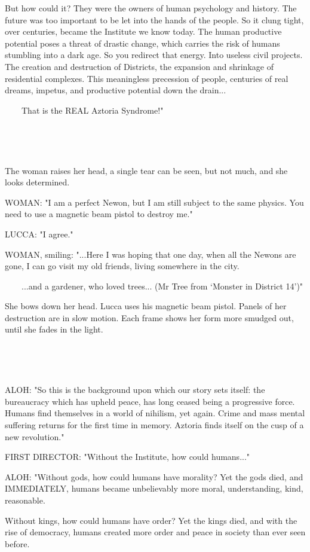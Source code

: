 \documentclass[11pt]{article}
\begin{document}
But how could it? 
They were the owners of human psychology and history.
The future was too important to be let into the hands of the people.
So it clung tight, over centuries, became the Institute we know today.
The human productive potential poses a threat of drastic change, which carries the risk of humans stumbling into a dark age.
So you redirect that energy.
Into useless civil projects.
The creation and destruction of Districts, the expansion and shrinkage of residential complexes.
This meaningless precession of people, centuries of real dreams, impetus, and productive potential down the drain...

\ \ \ \ That is the REAL Aztoria Syndrome!"

\ 

\ 

The woman raises her head, a single tear can be seen, but not much, and she looks determined.

WOMAN: "I am a perfect Newon, but I am still subject to the same physics.
You need to use a magnetic beam pistol to destroy me."

LUCCA: "I agree."

WOMAN, smiling: "...Here I was hoping that one day, when all the Newons are gone, I can go visit my old friends, living somewhere in the city.

\ \ \ \ ...and a gardener, who loved trees... (Mr Tree from `Monster in District 14')"

She bows down her head.
Lucca uses his magnetic beam pistol.
Panels of her destruction are in slow motion.
Each frame shows her form more smudged out, until she fades in the light.

\ 

\ 

ALOH: "So this is the background upon which our story sets itself: 
the bureaucracy which has upheld peace, has long ceased being a progressive force. 
Humans find themselves in a world of nihilism, yet again.
Crime and mass mental suffering returns for the first time in memory.
Aztoria finds itself on the cusp of a new revolution." 

FIRST DIRECTOR: "Without the Institute, how could humans..."

ALOH: "Without gods, how could humans have morality? 
Yet the gods died, and IMMEDIATELY, humans became unbelievably more moral, understanding, kind, reasonable.

Without kings, how could humans have order? 
Yet the kings died, and with the rise of democracy, humans created more order and peace in society than ever seen before. 
\end{document}
